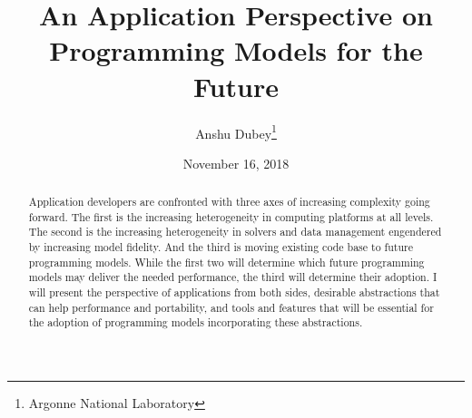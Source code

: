 \documentclass{article}
\title{An Application Perspective on Programming Models for the Future}
\author{Anshu Dubey\thanks{Argonne National Laboratory}}
\date{November 16, 2018}
\begin{document}
\maketitle

\begin{abstract}
	Application developers are confronted with three axes of increasing complexity going forward. The first is the increasing heterogeneity in computing platforms at all levels. The second is the increasing heterogeneity in solvers and data management engendered by increasing model fidelity. And the third is moving existing code base to future programming models. While the first two will determine which future programming models may deliver the needed performance, the third will determine their adoption. I will present the perspective of applications from both sides, desirable abstractions that can help performance and portability, and tools and features that will be essential for the adoption of programming models incorporating these abstractions.
\end{abstract}
\end{document}
